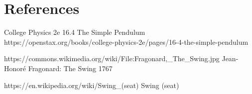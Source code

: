 \documentclass[12pt]{iopart}
\begin{document}
\section*{References}
\begin{thebibliography}{99}

College Physics 2e
16.4 The Simple Pendulum
https://openstax.org/books/college-physics-2e/pages/16-4-the-simple-pendulum

	https://commons.wikimedia.org/wiki/File:Fragonard,\_The\_Swing.jpg
	Jean-Honoré Fragonard: The Swing 
	1767

	https://en.wikipedia.org/wiki/Swing\_(seat)
		Swing (seat)

\end{thebibliography}
\end{document}
